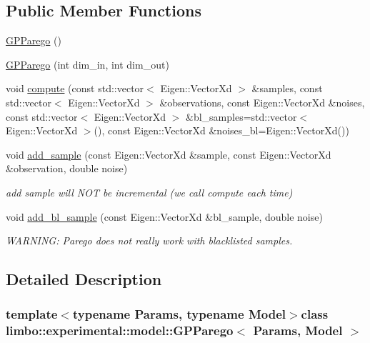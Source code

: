\subsection*{Public Member Functions}
\begin{DoxyCompactItemize}
\item 
\hyperlink{classlimbo_1_1experimental_1_1model_1_1_g_p_parego_ac351d6798add22da5c6dd58ac4a00723}{G\+P\+Parego} ()
\item 
\hyperlink{classlimbo_1_1experimental_1_1model_1_1_g_p_parego_a1f0eb578140f01874b13bfca124c085c}{G\+P\+Parego} (int dim\+\_\+in, int dim\+\_\+out)
\item 
void \hyperlink{classlimbo_1_1experimental_1_1model_1_1_g_p_parego_a7a7998bd37de03f046b737113b952b65}{compute} (const std\+::vector$<$ Eigen\+::\+Vector\+Xd $>$ \&samples, const std\+::vector$<$ Eigen\+::\+Vector\+Xd $>$ \&observations, const Eigen\+::\+Vector\+Xd \&noises, const std\+::vector$<$ Eigen\+::\+Vector\+Xd $>$ \&bl\+\_\+samples=std\+::vector$<$ Eigen\+::\+Vector\+Xd $>$(), const Eigen\+::\+Vector\+Xd \&noises\+\_\+bl=Eigen\+::\+Vector\+Xd())
\item 
void \hyperlink{classlimbo_1_1experimental_1_1model_1_1_g_p_parego_a81955696f79b4ac11a17d0faf28ccc31}{add\+\_\+sample} (const Eigen\+::\+Vector\+Xd \&sample, const Eigen\+::\+Vector\+Xd \&observation, double noise)
\begin{DoxyCompactList}\small\item\em add sample will N\+O\+T be incremental (we call compute each time) \end{DoxyCompactList}\item 
void \hyperlink{classlimbo_1_1experimental_1_1model_1_1_g_p_parego_aee0ce034411e11614069718a3140a3f8}{add\+\_\+bl\+\_\+sample} (const Eigen\+::\+Vector\+Xd \&bl\+\_\+sample, double noise)
\begin{DoxyCompactList}\small\item\em W\+A\+R\+N\+I\+N\+G\+: Parego does not really work with blacklisted samples. \end{DoxyCompactList}\end{DoxyCompactItemize}


\subsection{Detailed Description}
\subsubsection*{template$<$typename Params, typename Model$>$class limbo\+::experimental\+::model\+::\+G\+P\+Parego$<$ Params, Model $>$}

